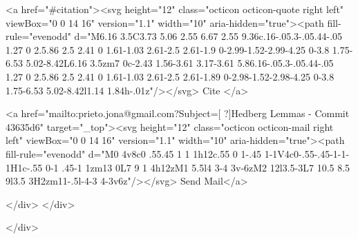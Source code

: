       <a  href="#citation"><svg height="12" class="octicon octicon-quote right left" viewBox="0 0 14 16" version="1.1" width="10" aria-hidden="true"><path fill-rule="evenodd" d="M6.16 3.5C3.73 5.06 2.55 6.67 2.55 9.36c.16-.05.3-.05.44-.05 1.27 0 2.5.86 2.5 2.41 0 1.61-1.03 2.61-2.5 2.61-1.9 0-2.99-1.52-2.99-4.25 0-3.8 1.75-6.53 5.02-8.42L6.16 3.5zm7 0c-2.43 1.56-3.61 3.17-3.61 5.86.16-.05.3-.05.44-.05 1.27 0 2.5.86 2.5 2.41 0 1.61-1.03 2.61-2.5 2.61-1.89 0-2.98-1.52-2.98-4.25 0-3.8 1.75-6.53 5.02-8.42l1.14 1.84h-.01z"/></svg> Cite
      </a>

      <a href="mailto:prieto.jona@gmail.com?Subject=[ ?]Hedberg Lemmas - Commit 43635d6" target="_top"><svg height="12" class="octicon octicon-mail right left" viewBox="0 0 14 16" version="1.1" width="10" aria-hidden="true"><path fill-rule="evenodd" d="M0 4v8c0 .55.45 1 1 1h12c.55 0 1-.45 1-1V4c0-.55-.45-1-1-1H1c-.55 0-1 .45-1 1zm13 0L7 9 1 4h12zM1 5.5l4 3-4 3v-6zM2 12l3.5-3L7 10.5 8.5 9l3.5 3H2zm11-.5l-4-3 4-3v6z"/></svg> Send Mail</a>

    </div>
  </div>

</div>




